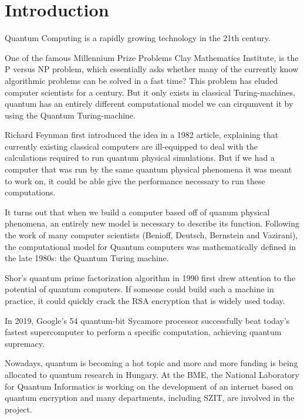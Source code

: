 \chapter{Introduction}

Quantum Computing is a rapidly growing technology in the 21th century. 

One of the famous Millennium Prize Problems  Clay Mathematics Institute,  is the P versus NP problem, which essentially asks whether many of the currently know algorithmic problems can be solved in a fast time? This problem has eluded computer scientists for a century. But it only exists in classical Turing-machines, quantum has an entirely different computational model we can cirqumvent it by using the Quantum Turing-machine.

Richard Feynman first introduced the idea in a 1982 article, explaining that currently existing classical computers are ill-equipped to deal with the calculations required to run quantum physical simulations. But if we had a computer that was run by the same quantum physical phenomena it was meant to work on, it could be able give the performance necessary to run these computations.

It turns out that when we build a computer based off of quanum physical phenomena, an entirely new model is necessary to describe its function. Following the work of many computer scientists (Benioff, Deutsch, Bernstein and Vazirani), the computational model for Quantum computers was mathematically defined in the late 1980s: the Quantum Turing machine.

Shor's quantum prime factorization algorithm in 1990 first drew attention to the potential of quantum computers. If someone could build such a machine in practice, it could quickly crack the RSA encryption that is widely used today.

In 2019, Google's 54 quantum-bit Sycamore processor successfully beat today's fastest supercomputer to perform a specific computation, achieving quantum supremacy.

Nowadays, quantum is becoming a hot topic and more and more funding is being allocated to quantum research in Hungary. At the BME, the National Laboratory for Quantum Informatics is working on the development of an internet based on quantum encryption and many departments, including SZIT, are involved in the project.
